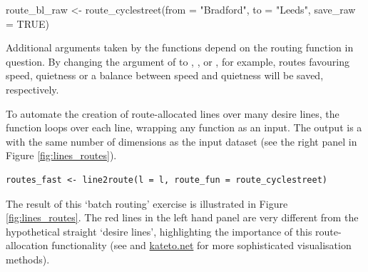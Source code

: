 \begin{Schunk}
\begin{Sinput}
route_bl_raw <- route_cyclestreet(from = "Bradford", to = "Leeds", save_raw = TRUE)
\end{Sinput}
\end{Schunk}

Additional arguments taken by the  functions depend on
the routing function in question. By changing the  argument
of  to , , or
, for example, routes favouring speed, quietness or a
balance between speed and quietness will be saved, respectively.

To automate the creation of route-allocated lines over many desire
lines, the  function loops over each line, wrapping
any  function as an input. The output is a
 with the same number of dimensions as the
input dataset (see the right panel in Figure \ref{fig:lines_routes}).

\begin{verbatim}
routes_fast <- line2route(l = l, route_fun = route_cyclestreet)
\end{verbatim}

The result of this `batch routing' exercise is illustrated in Figure
\ref{fig:lines_routes}. The red lines in the left hand panel are very
different from the hypothetical straight `desire lines', highlighting the importance of this route-allocation
functionality (see  and \href{http://kateto.net/network-visualization}{kateto.net} for more sophisticated visualisation methods).

